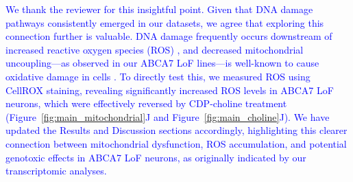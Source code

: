 \textcolor{blue}{We thank the reviewer for this insightful point. Given that DNA damage pathways consistently emerged in our datasets, we agree that exploring this connection further is valuable. DNA damage frequently occurs downstream of increased reactive oxygen species (ROS) \cite{Welch2022-bp}, and decreased mitochondrial uncoupling—as observed in our ABCA7 LoF lines—is well-known to cause oxidative damage in cells \cite{Jain2024-br, Crivelli2024-pf}. To directly test this, we measured ROS using CellROX staining, revealing significantly increased ROS levels in ABCA7 LoF neurons, which were effectively reversed by CDP-choline treatment (Figure~\ref{fig:main_mitochondrial}J and Figure~\ref{fig:main_choline}J). We have updated the Results and Discussion sections accordingly, highlighting this clearer connection between mitochondrial dysfunction, ROS accumulation, and potential genotoxic effects in ABCA7 LoF neurons, as originally indicated by our transcriptomic analyses.}

	
